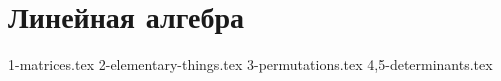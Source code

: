 \section{Линейная алгебра}
{1-matrices.tex}
{2-elementary-things.tex}
{3-permutations.tex}
{4,5-determinants.tex}
